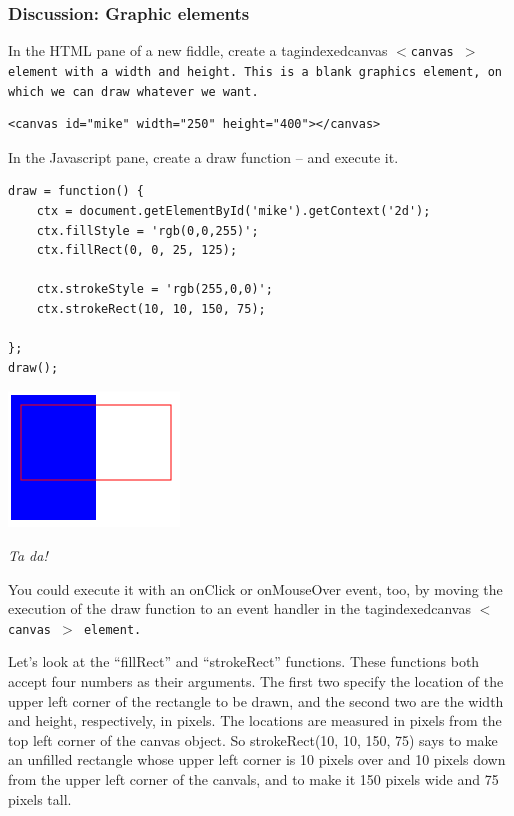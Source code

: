 \documentclass[11pt]{article}
\makeatletter
\newcommand{\tag}[2][\relax]{%
  \ifcsname tagindexed#2\endcsname\relax\else%
  \index{#2@\texttt{$<$#2$>$}}%
  \expandafter\gdef\csname tagindexed#2\endcsname{\relax}\fi%
  \bgroup\tt$<$#2\ifx#1\relax\relax\else~#1\fi$>$\egroup}
\makeatother
\begin{document}
\subsubsection{Discussion: Graphic elements}

In the HTML pane of a new fiddle, create a \tag{canvas} element with a
width and height.  This is a blank graphics element, on which we can
draw whatever we want.

\begin{verbatim}
<canvas id="mike" width="250" height="400"></canvas>
\end{verbatim}

In the Javascript pane, create a draw function -- and execute it.

\begin{verbatim}
draw = function() {
    ctx = document.getElementById('mike').getContext('2d');
    ctx.fillStyle = 'rgb(0,0,255)';
    ctx.fillRect(0, 0, 25, 125);

    ctx.strokeStyle = 'rgb(255,0,0)';
    ctx.strokeRect(10, 10, 150, 75);

};
draw();
\end{verbatim}

\begin{center}
\includegraphics[width=0.4\columnwidth]{rects.png}

\textit{Ta da!}
\end{center}

You could execute it with an onClick or onMouseOver event, too, by
moving the execution of the draw function to an event handler in the
\tag{canvas} element.

Let's look at the ``fillRect'' and ``strokeRect'' functions.  These
functions both accept four numbers as their arguments.  The first two
specify the location of the upper left corner of the rectangle to be
drawn, and the second two are the width and height, respectively, in
pixels.  The locations are measured in pixels from the top left corner
of the canvas object.  So strokeRect(10, 10, 150, 75) says to make an
unfilled rectangle whose upper left corner is 10 pixels over and 10
pixels down from the upper left corner of the canvals, and to make it
150 pixels wide and 75 pixels tall.
\end{document}
